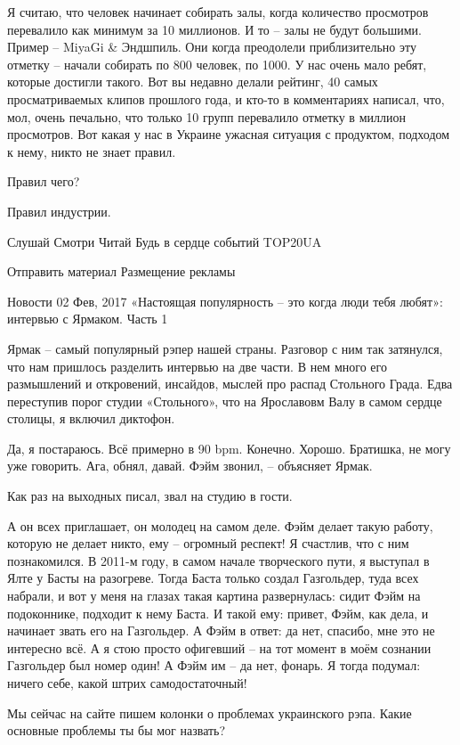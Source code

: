 Я считаю, что человек начинает собирать залы, когда количество просмотров
перевалило как минимум за 10 миллионов. И то – залы не будут большими. Пример –
MiyaGi & Эндшпиль. Они когда преодолели приблизительно эту отметку – начали
собирать по 800 человек, по 1000. У нас очень мало ребят, которые достигли
такого. Вот вы недавно делали рейтинг, 40 самых просматриваемых клипов прошлого
года, и кто-то в комментариях написал, что, мол, очень печально, что только 10
групп перевалило отметку в миллион просмотров. Вот какая у нас в Украине
ужасная ситуация с продуктом, подходом к нему, никто не знает правил.

Правил чего?

Правил индустрии.



    Слушай
    Смотри
    Читай
    Будь в сердце событий
    TOP20UA

    Отправить материал
    Размещение рекламы

Новости
02 Фев, 2017
«Настоящая популярность – это когда люди тебя любят»: интервью с Ярмаком. Часть 1

Ярмак – самый популярный рэпер нашей страны. Разговор с ним так затянулся, что нам пришлось разделить интервью на две части. В нем много его размышлений и откровений, инсайдов, мыслей про распад Стольного  Града. Едва переступив порог студии «Стольного», что на Ярославовм Валу в самом сердце столицы, я включил диктофон.  

Да, я постараюсь. Всё примерно в 90 bpm. Конечно. Хорошо. Братишка, не могу уже говорить. Ага, обнял, давай. Фэйм звонил, – объясняет Ярмак.

Как раз на выходных писал, звал на студию в гости.

А он всех приглашает, он молодец на самом деле. Фэйм делает такую работу, которую не делает никто, ему – огромный респект! Я счастлив, что с ним познакомился. В 2011-м году, в самом начале творческого пути, я выступал в Ялте у Басты на разогреве. Тогда Баста только создал Газгольдер, туда всех набрали, и вот у меня на глазах такая картина развернулась: сидит Фэйм на подоконнике, подходит к нему Баста. И такой ему: привет, Фэйм, как дела, и начинает звать его на Газгольдер. А Фэйм в ответ: да нет, спасибо, мне это не интересно всё. А я стою просто офигевший – на тот момент в моём сознании Газгольдер был номер один! А Фэйм им – да нет, фонарь. Я тогда подумал: ничего себе, какой штрих самодостаточный!

Мы сейчас на сайте пишем колонки о проблемах украинского рэпа. Какие основные проблемы ты бы мог назвать?


